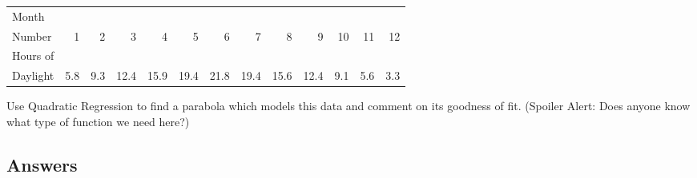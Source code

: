 \begin{enumerate}
\begin{enumerate}
\medskip

\small

\noindent \begin{tabular}{|l|r|r|r|r|r|r|r|r|r|r|r|r|} \hline
Month  & & & & & & & & & & & & \\
Number & 1 & 2 & 3 & 4 & 5 & 6 & 7 & 8 & 9 & 10 & 11 & 12\\ 
\hline 
Hours of  & & & & & & & & & & & & \\
Daylight & 5.8 & 9.3 & 12.4 & 15.9 & 19.4 & 21.8 & 19.4 & 15.6 & 12.4 & 9.1 & 5.6 & 3.3 \\ \hline
\end{tabular}

\normalsize

\medskip

\noindent Use Quadratic Regression to find a parabola which models this data and comment on its goodness of fit. (Spoiler Alert: Does anyone know what type of function we need here?)

\end{enumerate}

\end{enumerate}

\newpage

\subsection{Answers}

